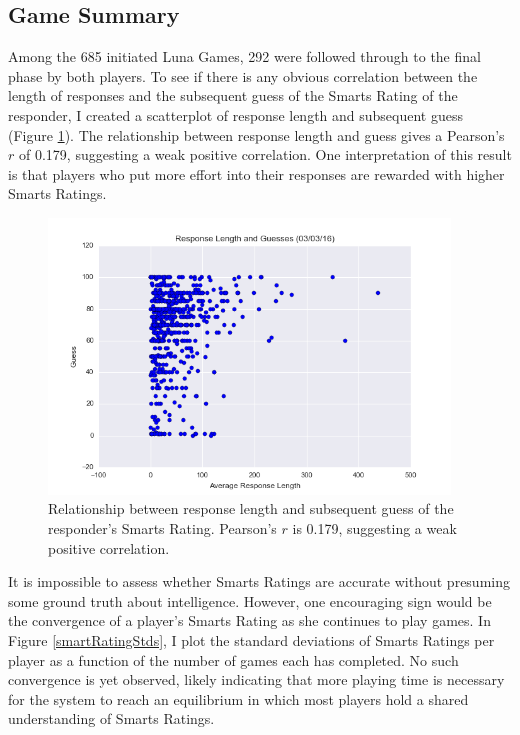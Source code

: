\subsection{Game Summary}

Among the 685 initiated Luna Games, 292 were followed through to the final phase by both players. To see if there is any obvious correlation between the length of responses and the subsequent guess of the Smarts Rating of the responder, I created a scatterplot of response length and subsequent guess (Figure \ref{responseLengthGuess}). The relationship between response length and guess gives a Pearson's $r$ of 0.179, suggesting a weak positive correlation. One interpretation of this result is that players who put more effort into their responses are rewarded with higher Smarts Ratings.

\begin{figure}
\includegraphics[width=0.95\textwidth]{figures/responseVsGuesses.png}
\caption{\label{responseLengthGuess} Relationship between response length and subsequent guess of the responder's Smarts Rating. Pearson's $r$ is 0.179, suggesting a weak positive correlation.}
\end{figure}

It is impossible to assess whether Smarts Ratings are accurate without presuming some ground truth about intelligence. However, one encouraging sign would be the convergence of a player's Smarts Rating as she continues to play games. In Figure \ref{smartRatingStds}, I plot the standard deviations of Smarts Ratings per player as a function of the number of games each has completed. No such convergence is yet observed, likely indicating that more playing time is necessary for the system to reach an equilibrium in which most players hold a shared understanding of Smarts Ratings. 

